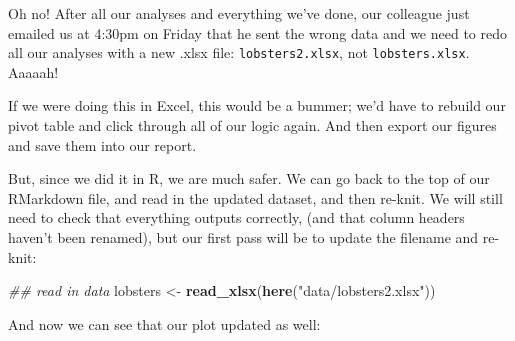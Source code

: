 \documentclass[]{book}
\newenvironment{Shaded}{\begin{snugshade}}{\end{snugshade}}
\newcommand{\CommentTok}[1]{\textcolor[rgb]{0.56,0.35,0.01}{\textit{#1}}}
\newcommand{\DataTypeTok}[1]{\textcolor[rgb]{0.13,0.29,0.53}{#1}}
\newcommand{\KeywordTok}[1]{\textcolor[rgb]{0.13,0.29,0.53}{\textbf{#1}}}
\newcommand{\NormalTok}[1]{#1}
\newcommand{\OperatorTok}[1]{\textcolor[rgb]{0.81,0.36,0.00}{\textbf{#1}}}
\newcommand{\OtherTok}[1]{\textcolor[rgb]{0.56,0.35,0.01}{#1}}
\newcommand{\StringTok}[1]{\textcolor[rgb]{0.31,0.60,0.02}{#1}}
\begin{document}
Oh no! After all our analyses and everything we've done, our colleague just emailed us at 4:30pm on Friday that he sent the wrong data and we need to redo all our analyses with a new .xlsx file: \texttt{lobsters2.xlsx}, not \texttt{lobsters.xlsx}. Aaaaah!

If we were doing this in Excel, this would be a bummer; we'd have to rebuild our pivot table and click through all of our logic again. And then export our figures and save them into our report.

But, since we did it in R, we are much safer. We can go back to the top of our RMarkdown file, and read in the updated dataset, and then re-knit. We will still need to check that everything outputs correctly, (and that column headers haven't been renamed), but our first pass will be to update the filename and re-knit:

\begin{Shaded}
\begin{Highlighting}[]
\CommentTok{## read in data}
\NormalTok{lobsters <-}\StringTok{ }\KeywordTok{read_xlsx}\NormalTok{(}\KeywordTok{here}\NormalTok{(}\StringTok{"data/lobsters2.xlsx"}\NormalTok{))}
\end{Highlighting}
\end{Shaded}

And now we can see that our plot updated as well:

\begin{Shaded}
\end{Shaded}
\end{document}

